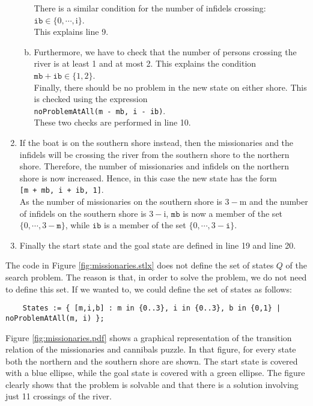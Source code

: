 \begin{enumerate}
\begin{enumerate}[(a)]
            There is a similar condition for the number of infidels crossing:
            \\[0.2cm]
            \hspace*{1.3cm}
            $\mathtt{ib} \in \{0,\cdots,\mathrm{i}\}$.
            \\[0.2cm]
            This explains line 9.
      \item Furthermore, we have to check that the number of persons crossing the river is at least 1
            and at most 2.  This explains the condition
            \\[0.2cm]
            \hspace*{1.3cm}
            $\mathtt{mb} + \mathtt{ib} \in \{1,2\}$.
            \\[0.2cm]
            Finally, there should be no problem in the new state on either shore.  This is checked
            using the expression
            \\[0.2cm]
            \hspace*{1.3cm}
            \texttt{noProblemAtAll(m - mb, i - ib)}.
            \\[0.2cm]
            These two checks are performed in line 10.
      \end{enumerate}
\item If the boat is on the southern shore instead, then the missionaries and the infidels will be crossing
      the river from the southern shore to the northern shore.  Therefore, the number of missionaries and
      infidels on the northern shore is now increased.  Hence, in this case the new state has the form
      \\[0.2cm]
      \hspace*{1.3cm}
      \texttt{[m + mb, i + ib, 1]}.
      \\[0.2cm]
      As the number of missionaries on the southern shore is $3 - \mathrm{m}$ and the number of infidels on the
      southern shore is $3 - \mathrm{i}$, $\mathtt{mb}$ is now a member of the set $\{0,\cdots,3 -\mathtt{m}\}$, while 
      $\mathtt{ib}$ is a member of the set $\{0,\cdots,3 - \mathtt{i}\}$.
\item Finally the start state and the goal state are defined in line 19 and line 20.
\end{enumerate}
The code in Figure \ref{fig:missionaries.stlx} does not define the set of states $Q$ of the search problem.  The
reason is that, in order to solve the problem, we do not need to define this set.  If we wanted to, we could
define the set of states as follows: 
\begin{verbatim}
    States := { [m,i,b] : m in {0..3}, i in {0..3}, b in {0,1} | noProblemAtAll(m, i) };
\end{verbatim}
Figure \ref{fig:missionaries.pdf} shows a graphical representation of the transition relation of the
missionaries and cannibals puzzle.  In that figure, for every state both the northern and the
southern shore are shown.  The start state is covered with a blue ellipse, while the goal state is
covered with a green ellipse.  The figure clearly shows that the problem is solvable and that there
is a solution involving just 11 crossings of the river.
\eox

